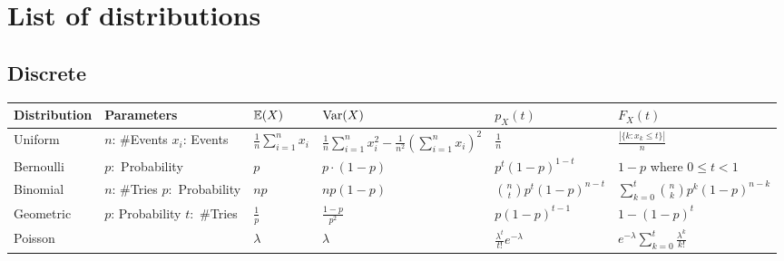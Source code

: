 \section{List of distributions}
\subsection{Discrete}
\begin{center}
	\begin{tabularx}{\textwidth}{llXXXX}
		\toprule 
		Distribution & Parameters & \(\mathbb{E}(X)\) & \(\operatorname{Var}(X)\) & \(p_X(t)\) & \(F_X(t)\) \\
		\midrule
		Uniform & \makecell[l]{\(n\): \#Events \\ \(x_i\): Events} & \(\frac{1}{n} \sum_{i=1}^{n} x_i\) & \(\frac{1}{n} \sum_{i=1}^{n} x_i^2 - \frac{1}{n^2} \left(\sum_{i=1}^{n} x_i \right)^2\) & \(\frac{1}{n}\) & \(\frac{|\{k:x_k \leq t\}|}{n}\) \\
		Bernoulli & \(p:\) Probability & \(p\) & \(p \cdot (1-p)\) & \(p^t(1-p)^{1-t}\) & \(1-p\) where \(0 \leq t < 1\) \\
		Binomial & \makecell[l] {\(n\): \#Tries \\ \(p:\) Probability} & \(np\) & \(np(1-p)\) & \(\binom{n}{t}p^t(1-p)^{n-t}\) & \(\sum_{k=0}^{t} \binom{n}{k} p^k(1-p)^{n-k}\) \\
		Geometric & \makecell[l] {\(p\): Probability \\ \(t:\) \#Tries} & \(\frac{1}{p}\) & \(\frac{1-p}{p^2}\) & \(p(1-p)^{t-1}\) & \(1-(1-p)^t\) \\
		Poisson          & \makecell[l]{ \(\lambda\): Lambda} & \(\lambda\) & \(\lambda\) & \(\frac{\lambda^t}{t!}e^{-\lambda}\) & \(e^{-\lambda} \sum_{k=0}^{t} \frac{\lambda^{k}}{k!}\) \\
		\bottomrule
	\end{tabularx}
\end{center}

